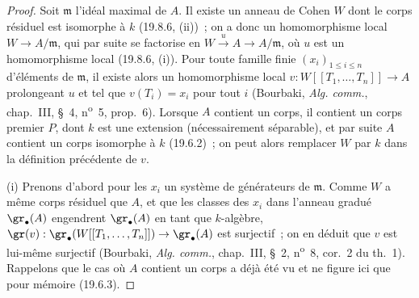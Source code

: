 \begin{proof}
Soit $\mathfrak m$ l'idéal maximal de $A$. Il existe un anneau de Cohen $W$ dont
le corps résiduel est isomorphe à $k$ (19.8.6, (ii))~; on a donc un
homomorphisme local $W\to A/\mathfrak m$, qui par suite se factorise en
$W\xrightarrow{u}A\to A/\mathfrak m$, où $u$ est un homomorphisme local
(19.8.6, (i)). Pour toute famille finie $(x_i)_{1\leq i\leq n}$ d'éléments de
$\mathfrak m$, il existe alors un homomorphisme local
$v:W[[T_1,\ldots,T_n]]\to A$ prolongeant $u$ et tel que $v(T_i)=x_i$ pour tout
$i$ (Bourbaki, \emph{Alg. comm.}, chap.~III, §~4, n\textsuperscript{o}~5,
prop.~6). Lorsque $A$ contient un corps, il contient un corps premier $P$, dont
$k$ est une extension (nécessairement séparable), et par suite $A$ contient un
corps isomorphe à $k$ (19.6.2)~; on peut alors remplacer $W$ par $k$ dans la
définition précédente de $v$.

\medskip
\noindent(i)\enspace
Prenons d'abord pour les $x_i$ un système de générateurs de $\mathfrak m$. Comme
$W$ a même corps résiduel que $A$, et que les classes des $x_i$ dans l'anneau
gradué $\gr_\bullet(A)$ engendrent $\gr_\bullet(A)$ en tant que $k$-algèbre,
$\gr(v):\gr_\bullet(W[[T_1,\ldots,T_n]])\to\gr_\bullet(A)$ est surjectif~; on
en déduit que $v$ est lui-même surjectif (Bourbaki, \emph{Alg. comm.},
chap.~III, §~2, n\textsuperscript{o}~8, cor.~2 du th.~1). Rappelons que le cas
où $A$ contient un corps a déjà été vu et ne figure ici que pour mémoire
(19.6.3).


\end{proof}

